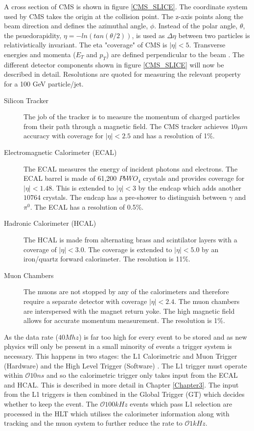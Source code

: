 A cross section of CMS is shown in figure \ref{CMS_SLICE}. The coordinate system used by CMS takes the origin at the collision point. The z-axis points along the beam direction and defines the azimuthal angle, $\phi$. Instead of the polar angle, $\theta$, the psuedorapidity, $\eta=-ln(tan(\theta/2))$, is used as $\Delta \eta$ between two particles is relativistically invariant. The eta "coverage" of CMS is $|\eta|<5$. Transverse energies and momenta ($E_T $ and $p_T$)  are defined perpendicular to the beam \cite{cmsiop}. The different detector components shown in figure \ref{CMS_SLICE} will now be described in detail. Resolutions are quoted for measuring the relevant property for a 100 GeV particle/jet\cite{SACharacteristics}.
\begin{description}
\item[Silicon Tracker]The job of the tracker is to measure the momentum of charged particles from their path through a magnetic field. The CMS tracker achieves $10\mu m$ accuracy with coverage for $|\eta|<2.5$ and has a resolution of 1\%.
\item[Electromagnetic Calorimeter (ECAL)] The ECAL measures the energy of incident photons and electrons. The ECAL barrel is made of 61,200 $PbWO_4$ crystals and provides coverage for $|\eta|<1.48$\cite{ecal}. This is extended to $|\eta|<3$ by the endcap which adds another $10764$ crystals. The endcap has a pre-shower to distinguish between $\gamma$ and $\pi^0$. The ECAL has a resolution of 0.5\%.
 \item[Hadronic Calorimeter (HCAL)] The HCAL is made from alternating brass and scintilator layers with a coverage of $|\eta|<3.0$\cite{hcal}. The coverage is extended to  $|\eta|<5.0$ by an iron/quartz forward calorimeter\cite{hfhcal}. The resolution is 11\%. 
 \item[Muon Chambers]The muons are not stopped by any of the calorimeters and therefore require a separate detector with coverage $|\eta| < 2.4$. The muon chambers are interspersed with the magnet return yoke. The high magnetic field allows for accurate momentum measurement\cite{muons}. The resolution is 1\%.
\end{description}
As the data rate ($40Mhz$) is far too high for every event to be stored and as new physics will only be present in a small minority of events a trigger system is necessary. This happens in two stages: the L1 Calorimetric and Muon Trigger (Hardware) and the High Level Trigger (Software) \cite{HLT}. The L1 trigger must operate within $\mathcal{O}10ns$ and so  the calorimetric trigger only takes input from the ECAL and HCAL. This is described in more detail in Chapter \ref{Chapter3}. The input from the L1 triggers is then combined in the Global Trigger (GT) which decides whether to keep the event. The $\mathcal{O}100kHz$ events which pass L1 selection are processed in the HLT which utilises the calorimeter information along with tracking and the muon system to further reduce the rate to $\mathcal{O}1kHz$.